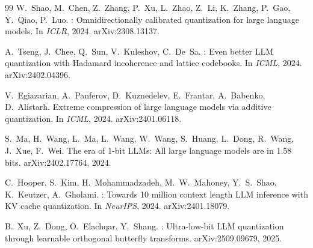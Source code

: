 \documentclass[11pt]{article}
\begin{document}
\begin{thebibliography}{99}
W.~Shao, M.~Chen, Z.~Zhang, P.~Xu, L.~Zhao, Z.~Li, K.~Zhang, P.~Gao, Y.~Qiao, P.~Luo.
: Omnidirectionally calibrated quantization for large language models.
\newblock In \emph{ICLR}, 2024. arXiv:2308.13137.

A.~Tseng, J.~Chee, Q.~Sun, V.~Kuleshov, C.~De~Sa.
: Even better {LLM} quantization with {Hadamard} incoherence and lattice codebooks.
\newblock In \emph{ICML}, 2024. arXiv:2402.04396.

V.~Egiazarian, A.~Panferov, D.~Kuznedelev, E.~Frantar, A.~Babenko, D.~Alistarh.
\newblock Extreme compression of large language models via additive quantization.
\newblock In \emph{ICML}, 2024. arXiv:2401.06118.

S.~Ma, H.~Wang, L.~Ma, L.~Wang, W.~Wang, S.~Huang, L.~Dong, R.~Wang, J.~Xue, F.~Wei.
\newblock The era of 1-bit {LLMs}: All large language models are in 1.58 bits.
\newblock arXiv:2402.17764, 2024.

C.~Hooper, S.~Kim, H.~Mohammadzadeh, M.~W.~Mahoney, Y.~S.~Shao, K.~Keutzer, A.~Gholami.
: Towards 10 million context length {LLM} inference with {KV} cache quantization.
\newblock In \emph{NeurIPS}, 2024. arXiv:2401.18079.

B.~Xu, Z.~Dong, O.~Elachqar, Y.~Shang.
: Ultra-low-bit {LLM} quantization through learnable orthogonal butterfly transforms.
\newblock arXiv:2509.09679, 2025.

\end{thebibliography}
\end{document}
